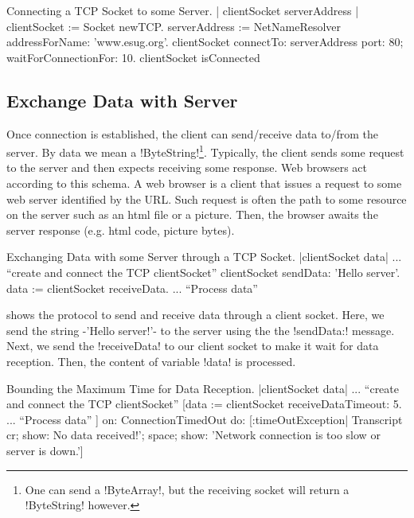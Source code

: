 \documentclass[a4paper,10pt,twoside]{book}
\begin{document}
\begin{script}[connectingTcpSocket]{Connecting a TCP Socket to some Server.}
| clientSocket serverAddress |
clientSocket := Socket newTCP.
serverAddress := NetNameResolver addressForName: 'www.esug.org'.
clientSocket 
	connectTo: serverAddress port: 80;
	waitForConnectionFor: 10.
clientSocket isConnected
\end{script}

\subsection{Exchange Data with Server}
Once connection is established, the client can send/receive data to/from the server.
By data we mean a \ct!ByteString!\footnote{One can send a \ct!ByteArray!, but the receiving socket will return a \ct!ByteString! however.}.
Typically, the client sends some request to the server and then expects receiving some response.
Web browsers act according to this schema.
A web browser is a client that issues a request to some web server identified by the URL.
Such request is often the path to some resource on the server such as an html file or a picture.
Then, the browser awaits the server response (e.g. html code, picture bytes).

\begin{script}[dataExhangeWithTcpSocket]{Exchanging Data with some Server through a TCP Socket.}
|clientSocket data|
... ``create and connect the TCP clientSocket''
clientSocket sendData: 'Hello server'.
data := clientSocket receiveData.
... ``Process data''
\end{script}

 shows the protocol to send and receive data through a client socket.
Here, we send the string \ct-'Hello server!'- to the server using the the \ct!sendData:! message.
Next, we send the \ct!receiveData! to our client socket to make it wait for data reception.
Then, the content of variable \ct!data! is processed.

\begin{script}[dataReceptionTimeOut]{Bounding the Maximum Time for Data Reception.}
|clientSocket data|
... ``create and connect the TCP clientSocket''
[data := clientSocket receiveDataTimeout: 5.
... ``Process data''
] on: ConnectionTimedOut 
do: [:timeOutException|
	Transcript 
		cr;
		show: No data received!'; 
		space;
		show: 'Network connection is too slow or server is down.']
\end{script}
\end{document}
